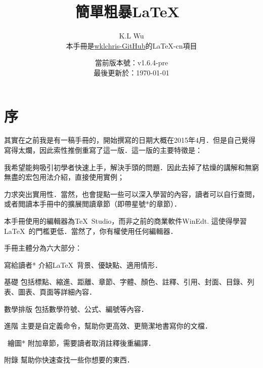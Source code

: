 

\title{簡單粗暴\LaTeX\ }
\author{K.L Wu\\
  {\kaishu 本手冊是\href{https://github.com/wklchris/Note-by-LaTeX}{wklchris-GitHub}的\LaTeX{}-cn項目}
}
\date{當前版本號：v1.6.4-pre\\
  最後更新於：\today}



\maketitle

\setlength{\lineskiplimit}{0pt}
\tableofcontents
\setlength{\lineskiplimit}{3pt}

\chapter{序}

\dpar\dpar

其實在之前我是有一稿手冊的，開始撰寫的日期大概在2015年4月．但是自己覺得寫得太爛，因此索性推倒重寫了這一版．這一版的主要特徵是：
\begin{feae}
  \item 我希望能夠吸引初學者快速上手，解決手頭的問題．因此去掉了枯燥的講解和無窮無盡的宏包用法介紹，直接使用實例；
  \item 力求突出實用性．當然，也會提點一些可以深入學習的內容，讀者可以自行查閲，或者閲讀本手冊中的擴展閲讀章節（即帶星號*的章節）．
  \item 本手冊使用的編輯器為\TeX\ Studio，而非之前的商業軟件WinEdt. 這使得學習\LaTeX\ 的門檻更低．當然了，你有權使用任何編輯器．
\end{feae}

手冊主體分為六大部分\cite{LHY2013latex,lamport1994latex,frank2004latex,partl2016,Casteleyn2016tikz,tikzmanual}：
\begin{fead}
\item[寫給讀者*] 介紹\LaTeX\ 背景、優缺點、適用情形．
\item[基礎] 包括標點、縮進、距離、章節、字體、顏色、註釋、引用、封面、目錄、列表、圖表、頁面等詳細內容．
\item[數學排版] 包括數學符號、公式、編號等內容．
\item[進階] 主要是自定義命令，幫助你更高效、更簡潔地書寫你的文檔．
\item[\tikzz\  繪圖*] 附加章節，需要讀者取消註釋後重編譯．
\item[附錄] 幫助你快速查找一些你想要的東西．
\end{fead}

